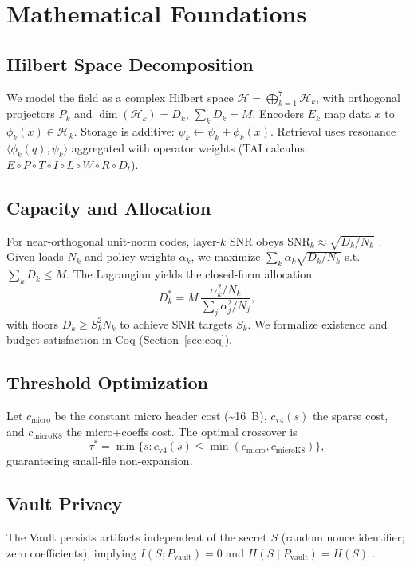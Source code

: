 \documentclass[conference]{IEEEtran}
\begin{document}
\section{Mathematical Foundations}
\subsection{Hilbert Space Decomposition}
We model the field as a complex Hilbert space $\mathcal{H} = \bigoplus_{k=1}^7 \mathcal{H}_k$, with orthogonal projectors $P_k$ and $\dim(\mathcal{H}_k)=D_k$, $\sum_k D_k = M$. Encoders $E_k$ map data $x$ to $\phi_k(x)\in\mathcal{H}_k$. Storage is additive: $\psi_k \leftarrow \psi_k + \phi_k(x)$. Retrieval uses resonance $\langle \phi_k(q), \psi_k \rangle$ aggregated with operator weights (TAI calculus: $E \circ P \circ T \circ I \circ L \circ W \circ R \circ D_t$).

\subsection{Capacity and Allocation} For near-orthogonal unit-norm codes, layer-$k$ SNR obeys $\mathrm{SNR}_k \approx \sqrt{D_k/N_k}$ \cite{oppenheim1999}. Given loads $N_k$ and policy weights $\alpha_k$, we maximize $\sum_k \alpha_k\sqrt{D_k/N_k}$ s.t. $\sum_k D_k\le M$. The Lagrangian yields the closed-form allocation
\begin{equation}
D_k^* = M\,\frac{\alpha_k^2/N_k}{\sum_j \alpha_j^2/N_j},\label{eq:alloc}
\end{equation}
with floors $D_k\ge S_k^2N_k$ to achieve SNR targets $S_k$. We formalize existence and budget satisfaction in Coq (Section~\ref{sec:coq}).

\subsection{Threshold Optimization} Let $c_{\text{micro}}$ be the constant micro header cost (\textasciitilde16~B), $c_{\text{v4}}(s)$ the sparse cost, and $c_{\text{microK8}}$ the micro+coeffs cost. The optimal crossover is
\begin{equation}
\tau^* = \min\{s: c_{\text{v4}}(s) \le \min(c_{\text{micro}}, c_{\text{microK8}})\},\label{eq:tau}
\end{equation}
guaranteeing small-file non-expansion.

\subsection{Vault Privacy} The Vault persists artifacts independent of the secret $S$ (random nonce identifier; zero coefficients), implying $I(S;P_{\text{vault}})=0$ and $H(S\mid P_{\text{vault}})=H(S)$ \cite{cover2006}.
\end{document}
